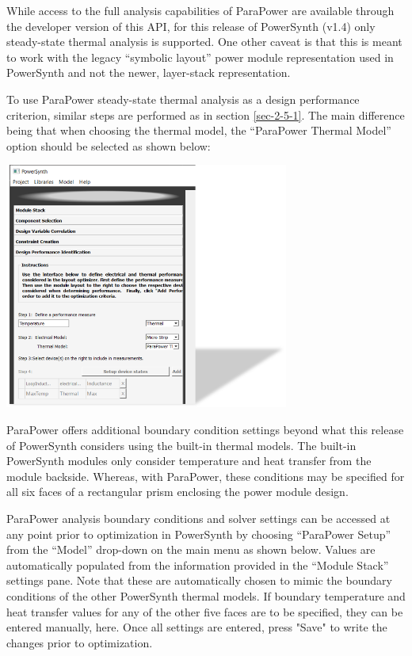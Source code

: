 \documentclass[11pt]{article}
\begin{document}
While access to the full analysis capabilities of ParaPower are available through the developer version of this API, for this release of PowerSynth (v1.4) only steady-state thermal analysis is supported. One other caveat is that this is meant to work with the legacy “symbolic layout” power module representation used in PowerSynth and not the newer, layer-stack representation.

To use ParaPower steady-state thermal analysis as a design performance criterion, similar steps are performed as in section \ref{sec-2-5-1}. The main difference being that when choosing the thermal model, the “ParaPower Thermal Model” option should be selected as shown below:

\begin{center}
\includegraphics[width=0.7\textwidth]{./figs/ParaPower/ParaPowerDesignPerformance_Thermal.png}
\end{center}

ParaPower offers additional boundary condition settings beyond what this release of PowerSynth considers using the built-in thermal models. The built-in PowerSynth modules only consider temperature and heat transfer from the module backside. Whereas, with ParaPower, these conditions may be specified for all six faces of a rectangular prism enclosing the power module design. 

ParaPower analysis boundary conditions and solver settings can be accessed at any point prior to optimization in PowerSynth by choosing “ParaPower Setup” from the “Model” drop-down on the main menu as shown below. Values are automatically populated from the information provided in the “Module Stack” settings pane. Note that these are automatically chosen to mimic the boundary conditions of the other PowerSynth thermal models. If boundary temperature and heat transfer values for any of the other five faces are to be specified, they can be entered manually, here. Once all settings are entered, press "Save" to write the changes prior to optimization.
\end{document}
